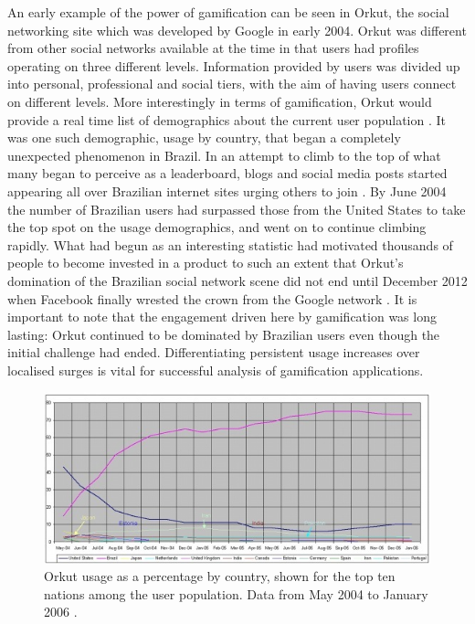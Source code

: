 \documentclass[12pt,a4paper,twoside]{report}
\begin{document}
An early example of the power of gamification can be seen in Orkut, the social networking site which was developed by Google in early 2004. Orkut was different from other social networks available at the time in that users had profiles operating on three different levels. Information provided by users was divided up into personal, professional and social tiers, with the aim of having users connect on different levels. More interestingly in terms of gamification, Orkut would provide a real time list of demographics about the current user population \cite{fragoso2006wtf}. It was one such demographic, usage by country, that began a completely unexpected phenomenon in Brazil. In an attempt to climb to the top of what many began to perceive as a leaderboard, blogs and social media posts started appearing all over Brazilian internet sites urging others to join \cite{zichermann2010game}. By June 2004 the number of Brazilian users had surpassed those from the United States to take the top spot on the usage demographics, and went on to continue climbing rapidly. What had begun as an interesting statistic had motivated thousands of people to become invested in a product to such an extent that Orkut's domination of the Brazilian social network scene did not end until December 2012 when Facebook finally wrested the crown from the Google network \cite{1_comscore_2012}. It is important to note that the engagement driven here by gamification was long lasting: Orkut continued to be dominated by Brazilian users even though the initial challenge had ended. Differentiating persistent usage increases over localised surges is vital for successful analysis of gamification applications.

\begin{figure}
\begin{center}
	\includegraphics{../img/orkut-brazil.jpg}
	\caption{Orkut usage as a percentage by country, shown for the top ten nations among the user population. Data from May 2004 to January 2006 \cite{fragoso2006wtf}.}
	\label{orkut-brazil}
\end{center}
\end{figure}
\end{document}
